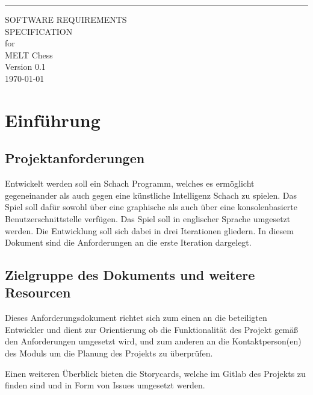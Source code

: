 \documentclass{scrreprt}
\date{}
\def\myversion{0.1 }
\begin{document}
\begin{flushright}
    \rule{16cm}{5pt}\vskip1cm
    \begin{bfseries}
        \Huge{SOFTWARE REQUIREMENTS\\ SPECIFICATION}\\
        \vspace{1.5cm}
        for\\
        \vspace{1.5cm}
        MELT Chess\\
        \vspace{1.5cm}
        \LARGE{Version \myversion}\\
        \vspace{1.5cm}
        \vspace{1.5cm}
        \today\\
    \end{bfseries}
\end{flushright}

\tableofcontents

\chapter{Einführung}

\section{Projektanforderungen}
Entwickelt werden soll ein Schach Programm, welches es ermöglicht gegeneinander als auch gegen eine künstliche Intelligenz Schach zu spielen. Das Spiel soll dafür sowohl über eine graphische als auch über eine konsolenbasierte Benutzerschnittstelle verfügen. Das Spiel soll in englischer Sprache umgesetzt werden. Die Entwicklung soll sich dabei in drei Iterationen gliedern. In diesem Dokument sind die Anforderungen an die erste Iteration dargelegt.

\section{Zielgruppe des Dokuments und weitere Resourcen}
Dieses Anforderungsdokument richtet sich zum einen an die beteiligten Entwickler und dient zur Orientierung ob die Funktionalität des Projekt gemäß den Anforderungen umgesetzt wird, und zum anderen an die Kontaktperson(en) des Moduls um die Planung des Projekts zu überprüfen.

Einen weiteren Überblick bieten die Storycards, welche im Gitlab des Projekts zu finden sind und in Form von Issues umgesetzt werden.
\end{document}
